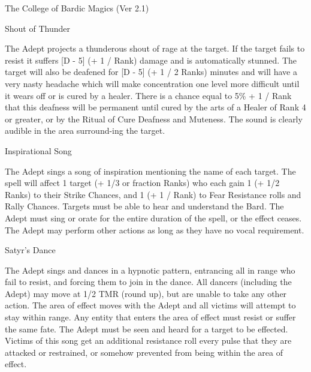 \begin{Chapter}{The College of Bardic Magics (Ver 2.1)}
\begin{spell}[S-7]{Shout of Thunder}
\begin{effects}
The Adept projects a thunderous shout of rage at the target. If the
target fails to resist it suffers [D - 5] (+ 1 / Rank) damage and is
automatically stunned.  The target will also be deafened for [D - 5]
(+ 1 / 2 Ranks) minutes and will have a very nasty headache which will
make concentration one level more difficult until it wears off or is
cured by a healer. There is a chance equal to 5\% + 1 / Rank that this
deafness will be permanent until cured by the arts of a Healer of Rank
4 or greater, or by the Ritual of Cure Deafness and Muteness.  The
sound is clearly audible in the area surround-ing the target.
\end{effects}
\end{spell}

\begin{spell}[S-8]{Inspirational Song}

\begin{effects}
The Adept sings a song of inspiration mentioning the name of each
target.  The spell will affect 1 target (+ 1/3 or fraction Ranks) who
each gain 1 (+ 1/2 Ranks) to their Strike Chances, and 1 (+ 1 / Rank)
to Fear Resistance rolls and Rally Chances.  Targets must be able to
hear and understand the Bard.  The Adept must sing or orate for the
entire duration of the spell, or the effect ceases.  The Adept may
perform other actions as long as they have no vocal requirement.
\end{effects}
\end{spell}

\begin{spell}[S-9]{Satyr’s Dance}

\begin{effects}
The Adept sings and dances in a hypnotic pattern, entrancing all in
range who fail to resist, and forcing them to join in the dance.  All
dancers (including the Adept) may move at 1/2 TMR (round up), but are
unable to take any other action.  The area of effect moves with the
Adept and all victims will attempt to stay within range.  Any entity
that enters the area of effect must resist or suffer the same fate.
The Adept must be seen and heard for a target to be effected.  Victims
of this song get an additional resistance roll every pulse that they
are attacked or restrained, or somehow prevented from being within the
area of effect.
\end{effects}
\end{spell}


\end{Chapter}
